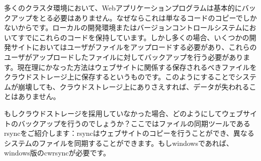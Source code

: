 多くのクラスタ環境において、Webアプリケーションプログラムは基本的にバックアップをとる必要はありません。なぜならこれは単なるコードのコピーでしかないからです。ローカルの開発環境またはバージョンコントロールシステムにおいてすでにこれらのコードを保持しています。しかし多くの場合、いくつかの開発サイトにおいてはユーザがファイルをアップロードする必要があり、これらのユーザがアップロードしたファイルに対してバックアップを行う必要があります。現在理にかなった方法はウェブサイトに関係する保存されるべきファイルをクラウドストレージ上に保存するというものです。このようにすることでシステムが崩壊しても、クラウドストレージ上にありさえすれば、データが失われることはありません。

もしクラウドストレージを採用していなかった場合、どのようにしてウェブサイトのバックアップを行うのでしょうか？ここではファイルの同期ツールであるrsyncをご紹介します：rsyncはウェブサイトのコピーを行うことができ、異なるシステムのファイルを同期することができます。もしwindowsであれば、windows版のcwrsyncが必要です。
